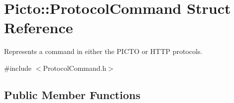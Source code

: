 \hypertarget{struct_picto_1_1_protocol_command}{\section{Picto\-:\-:Protocol\-Command Struct Reference}
\label{struct_picto_1_1_protocol_command}
}


Represents a command in either the P\-I\-C\-T\-O or H\-T\-T\-P protocols.  




{\ttfamily \#include $<$Protocol\-Command.\-h$>$}

\subsection*{Public Member Functions}
